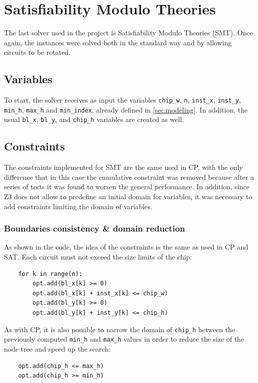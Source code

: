 \documentclass[a4paper, 12pt]{article}
\begin{document}
\clearpage


\section{Satisfiability Modulo Theories}\label{sec:smt}

The last solver used in the project is Satisfiability Modulo Theories (SMT). Once again, the instances were solved both in the standard way and by allowing circuits to be rotated.


\subsection{Variables}

To start, the solver receives as input the variables \verb|chip_w|, \verb|n|, \verb|inst_x|, \verb|inst_y|, \verb|min_h|, \verb|max_h| and \verb|min_index|, already defined in \cref{sec:modeling}. In addition, the usual \verb|bl_x|, \verb|bl_y|, and \verb|chip_h| variables are created as well.


\subsection{Constraints}

The constraints implemented for SMT are the same used in CP, with the only difference that in this case the cumulative constraint was removed because after a series of tests it was found to worsen the general performance. In addition, since Z3 does not allow to predefine an initial domain for variables, it was necessary to add constraints limiting the domain of variables.


\subsubsection{Boundaries consistency \& domain reduction}

As shown in the code, the idea of the constraints is the same as used in CP and SAT. Each circuit must not exceed the size limits of the chip:
\begin{verbatim}
    for k in range(n):
        opt.add(bl_x[k] >= 0)
        opt.add(bl_x[k] + inst_x[k] <= chip_w)
        opt.add(bl_y[k] >= 0)
        opt.add(bl_y[k] + inst_y[k] <= chip_h)
\end{verbatim}

As with CP, it is also possible to narrow the domain of \verb|chip_h| between the previously computed \verb|min_h| and \verb|max_h| values in order to reduce the size of the node tree and speed up the search:
\begin{verbatim}
    opt.add(chip_h <= max_h)
    opt.add(chip_h >= min_h)
\end{verbatim}
\end{document}
